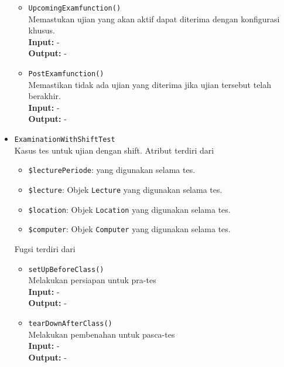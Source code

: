 \begin{itemize}
\begin{itemize}
                    \item \texttt{UpcomingExamfunction()} \\
                        Memastukan ujian yang akan aktif dapat diterima dengan
                        konfigurasi khusus. \\
                        \textbf{Input:} - \\
                        \textbf{Output:} -
                        
                    \item \texttt{PostExamfunction()} \\
                        Memastikan tidak ada ujian yang diterima jika ujian
                        tersebut telah berakhir. \\
                        \textbf{Input:} - \\
                        \textbf{Output:} -
                \end{itemize}
                
            \item \texttt{ExaminationWithShiftTest} \\
                Kasus tes untuk ujian dengan shift. Atribut terdiri dari
                \begin{itemize}
                    \item \texttt{\$lecturePeriode}:  yang digunakan selama tes.
                    \item \texttt{\$lecture}: Objek \texttt{Lecture} yang
                    digunakan selama tes.
                    \item \texttt{\$location}: Objek \texttt{Location} yang
                    digunakan selama tes.
                    \item \texttt{\$computer}: Objek \texttt{Computer} yang
                    digunakan selama tes.
                \end{itemize}
                Fugsi terdiri dari
                \begin{itemize}
                    \item \texttt{setUpBeforeClass()} \\
                        Melakukan persiapan untuk pra-tes \\
                        \textbf{Input:} -\\
                        \textbf{Output:} -
                    
                    \item \texttt{tearDownAfterClass()} \\
                        Melakukan pembenahan untuk pasca-tes \\
                        \textbf{Input:} -\\
                        \textbf{Output:} -
                    

\end{itemize}
\end{itemize}
